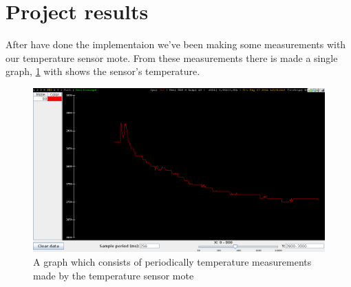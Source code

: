 \section{Project results}
After have done the implementaion we've been making some measurements with our temperature sensor mote. From these measurements there is made a single graph, \ref{fig:results} with shows the sensor's temperature.
\begin{landscape}
\begin{figure}[htbp]
\begin{center}
\includegraphics[width=26cm]{img/graph}
\caption{A graph which consists of periodically temperature measurements made by the temperature sensor mote}
\label{fig:results}
\end{center}
\end{figure}
\end{landscape}
